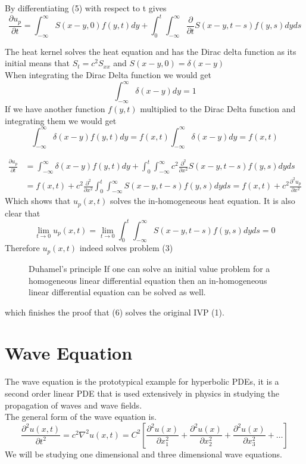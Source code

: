 \documentclass[]{article}
\begin{document}
By differentiating (5) with respect to t gives
\[
    \frac{\partial u_p}{\partial t} = \int_{-\infty}^{\infty}S(x-y,0) f(y,t) dy  + \int_{0}^{t}\int_{-\infty}^{\infty}\frac{\partial}{\partial t}S(x-y,t-s) f(y,s)dyds    
\]
\begin{enrichment*}{}
    The heat kernel solves the heat equation and has the Dirac delta function as its initial
    means that $S_t =c^2 S_{xx}$ and $S(x-y,0) = \delta(x-y)$
    \\
    When integrating the Dirac Delta function we would get
    \[
        \int_{-\infty}^{\infty}\delta(x-y) dy = 1
    \]
    If we have another function $f(y,t)$ multiplied to the Dirac Delta function and integrating them we would get
    \[
        \int_{-\infty}^{\infty}\delta(x-y) f(y,t) dy = f(x,t)\int_{-\infty}^{\infty}\delta(x-y) dy = f(x,t) 
    \]
\end{enrichment*}
\begin{align*}
    \frac{\partial u_p}{\partial t} &= \int_{-\infty}^{\infty}\delta(x-y) f(y,t) dy  + \int_{0}^{t}\int_{-\infty}^{\infty}c^2 \frac{\partial^2}{\partial x^2}S(x-y,t-s) f(y,s)dyds
    \\
    &= f(x,t) + c^2 \frac{\partial^2}{\partial x^2} \int_{0}^{t}\int_{-\infty}^{\infty}S(x-y,t-s) f(y,s)dyds
    = f(x,t) + c^2 \frac{\partial^2 u_p}{\partial x^2}
\end{align*}
Which shows that $u_p(x,t)$ solves the in-homogeneous heat equation. It is also clear that
\[
\lim_{t \to 0} u_p(x,t)  = \lim_{t \to 0}\int_{0}^{t} \int_{-\infty}^{\infty}S(x-y,t-s) f(y,s)dyds = 0
\]
Therefore $u_p(x,t)$ indeed solves problem (3)
\begin{figure}[b]
    \begin{enrichment*}{Duhamel's principle}
        If one can solve an initial value problem for a homogeneous linear differential equation then an in-homogeneous linear differential equation can be solved as well.
    \end{enrichment*}    
\end{figure}
which finishes the proof that (6) solves the original IVP (1).

\newpage
\setcounter{equation}{0}
\section{Wave Equation}
The wave equation is the prototypical example for hyperbolic PDEs, it is a second order linear PDE that is used extensively in physics in studying the propagation of waves and wave fields. 
\\
The general form of the wave equation is.
\[
\frac{\partial^2 u(x,t)}{\partial t^2} = c^2\nabla^2 u(x,t) = C^2\left[\frac{\partial^2 u(x)}{\partial x^{2}_{1}} + \frac{\partial^2 u(x)}{\partial x^{2}_{2}} + \frac{\partial^2 u(x)}{\partial x^{2}_{3}} + \dots\right]    
\]
We will be studying one dimensional and three dimensional wave equations.
\setcounter{equation}{0}
\end{document}
